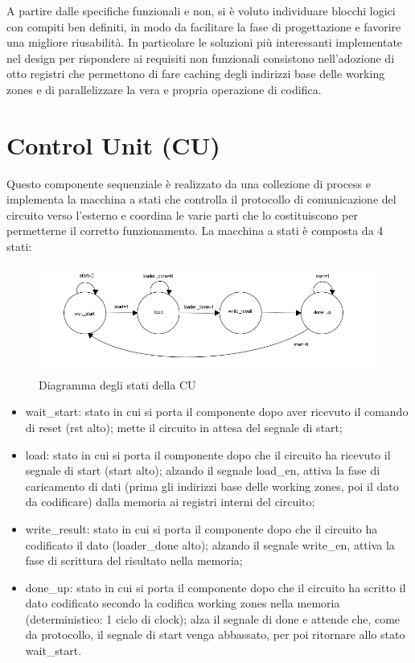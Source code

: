 \documentclass[10pt,english, openany]{book}
\begin{document}
A partire dalle specifiche funzionali e non, si è voluto individuare blocchi logici con compiti ben definiti, in modo da facilitare la fase di progettazione e favorire una migliore riusabilità. In particolare le soluzioni più interessanti implementate nel design per rispondere ai requisiti non funzionali consistono nell’adozione di otto registri che permettono di fare caching degli indirizzi base delle working zones e di parallelizzare la vera e propria operazione di codifica.

\section{Control Unit (CU)}

Questo componente sequenziale è realizzato da una collezione di process e implementa la macchina a stati che controlla il protocollo di comunicazione del circuito verso l’esterno e coordina le varie parti che lo costituiscono per permetterne il corretto funzionamento. La macchina a stati è composta da 4 stati:

\begin{figure}[h!] %
    \centering
    \includegraphics[scale=0.75]{stati_cu.png}
    \caption{Diagramma degli stati della CU}
    \label{fig:stati_cu}
\end{figure}{}

\begin{itemize}
  \item wait\_start: stato in cui si porta il componente dopo aver ricevuto il        comando di reset (rst alto); mette il circuito in attesa del segnale di       start;
  \item load: stato in cui si porta il componente dopo che il circuito ha             ricevuto il segnale di start (start alto); alzando il segnale load\_en, attiva la fase di caricamento       di dati (prima gli indirizzi base delle working zones, poi il dato da         codificare) dalla memoria ai registri interni del circuito;
  \item write\_result: stato in cui si porta il componente dopo che il circuito       ha codificato il dato (loader\_done alto); alzando il segnale write\_en, attiva la fase di scrittura del risultato nella        memoria;
  \item done\_up: stato in cui si porta il componente dopo che il circuito ha         scritto il dato codificato secondo la codifica working zones nella            memoria (deterministico: 1 ciclo di clock); alza il segnale di done e attende che, come da protocollo, il        segnale di start venga abbassato, per poi ritornare allo stato                wait\_start.
\end{itemize}
\end{document}
